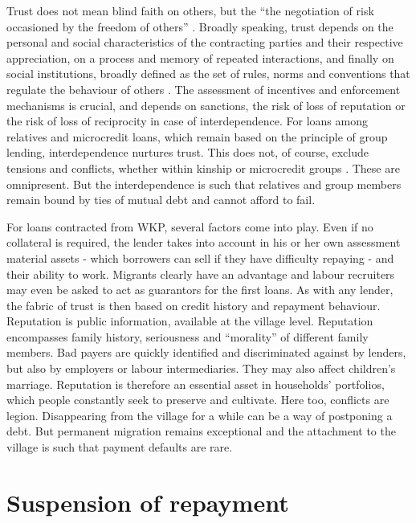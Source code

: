 \documentclass[a4paper, 11pt, onecolumn]{article}
\begin{document}
Trust does not mean blind faith on others, but the “the negotiation of risk occasioned by the freedom of others” \citep[p.188]{Hart2000}. Broadly speaking, trust depends on the personal and social characteristics of the contracting parties and their respective appreciation, on a process and memory of repeated interactions, and finally on social institutions, broadly defined as the set of rules, norms and conventions that regulate the behaviour of others \citep{Platteau1994}. The assessment of incentives and enforcement mechanisms is crucial, and depends on sanctions, the risk of loss of reputation or the risk of loss of reciprocity in case of interdependence. For loans among relatives and microcredit loans, which remain based on the principle of group lending, interdependence nurtures trust. This does not, of course, exclude tensions and conflicts, whether within kinship or microcredit groups \citep{Kar2018}. These are omnipresent. But the interdependence is such that relatives and group members remain bound by ties of mutual debt and cannot afford to fail. 

For loans contracted from WKP, several factors come into play. Even if no collateral is required, the lender takes into account in his or her own assessment material assets - which borrowers can sell if they have difficulty repaying - and their ability to work. Migrants clearly have an advantage and labour recruiters may even be asked to act as guarantors for the first loans. As with any lender, the fabric of trust is then based on credit history and repayment behaviour. Reputation is public information, available at the village level. Reputation encompasses family history, seriousness and ``morality'' of different family members. Bad payers are quickly identified and discriminated against by lenders, but also by employers or labour intermediaries. They may also affect children’s marriage. 
Reputation is therefore an essential asset in households’ portfolios, which people constantly seek to preserve and cultivate. 
Here too, conflicts are legion. Disappearing from the village for a while can be a way of postponing a debt. But permanent migration remains exceptional and the attachment to the village is such that payment defaults are rare.

\section{Suspension of repayment}
\label{section:repayment}
\end{document}
